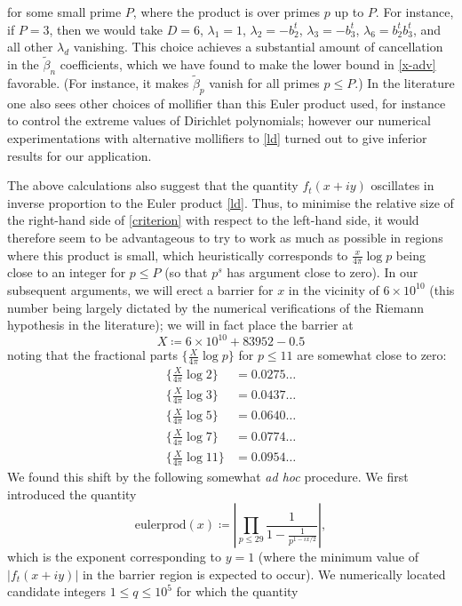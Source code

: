 for some small prime $P$, where the product is over primes $p$ up to $P$.  For instance, if $P = 3$, then we would take $D=6$, $\lambda_1 = 1$, $\lambda_2 = - b_2^t$, $\lambda_3 = -b_3^t$, $\lambda_6 = b_2^t b_3^t$, and all other $\lambda_d$ vanishing.  This choice achieves a substantial amount of cancellation in the $\tilde \beta_n$ coefficients, which we have found to make the lower bound in \eqref{x-adv} favorable.  (For instance, it makes $\tilde \beta_p$ vanish for all primes $p \leq P$.)  In the literature one also sees other choices of mollifier than this Euler product used, for instance to control the extreme values of Dirichlet polynomials; however our numerical experimentations with alternative mollifiers to \eqref{ld} turned out to give inferior results for our application.

The above calculations also suggest that the quantity $f_t(x+iy)$ oscillates in inverse proportion to the Euler product \eqref{ld}.  Thus, to minimise the relative size of the right-hand side of \eqref{criterion} with respect to the left-hand side, it would therefore seem to be advantageous to try to work as much as possible in regions where this product is small, which heuristically corresponds to $\frac{x}{4\pi} \log p$ being close to an integer for $p \leq P$ (so that $p^s$ has argument close to zero).  In our subsequent arguments, we will erect a barrier for $x$ in the vicinity of $6 \times 10^{10}$ (this number being largely dictated by the numerical verifications of the Riemann hypothesis in the literature); we will in fact place the barrier at
$$ X \coloneqq 6 \times 10^{10} + 83952 - 0.5$$
noting that the fractional parts $\{ \frac{X}{4\pi} \log p\}$ for $p \leq 11$ are somewhat close to zero:
\begin{align*}
\{ \frac{X}{4\pi} \log 2 \} &= 0.0275\dots \\
\{ \frac{X}{4\pi} \log 3 \} &= 0.0437\dots \\
\{ \frac{X}{4\pi} \log 5 \} &= 0.0640\dots \\
\{ \frac{X}{4\pi} \log 7 \} &= 0.0774\dots\\
\{ \frac{X}{4\pi} \log 11 \} &= 0.0954\dots
\end{align*}
We found this shift by the following somewhat \emph{ad hoc} procedure.  We first introduced the quantity
$$ \mathrm{eulerprod}(x) \coloneqq \left|\prod\limits_{p \leq 29}\frac{1}{1-\frac{1}{p^{1-ix/2}}}\right|,$$
which is the  exponent corresponding to $y=1$ (where the minimum value of $|f_t(x+iy)|$ in the barrier region is expected to occur).  We numerically located candidate integers $1 \leq q \leq 10^5$ for which the quantity
